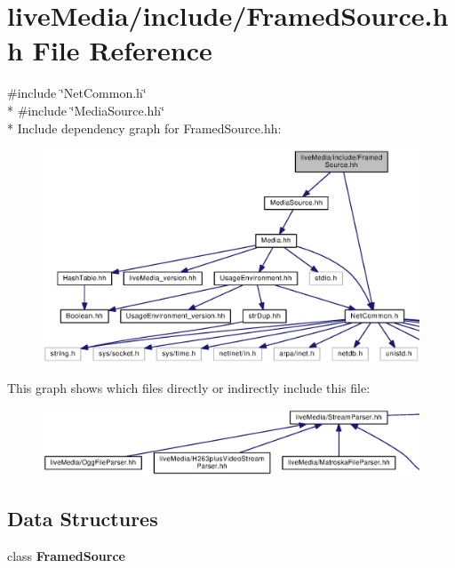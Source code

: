 \section{live\+Media/include/\+Framed\+Source.hh File Reference}
\label{FramedSource_8hh}
{\ttfamily \#include \char`\"{}Net\+Common.\+h\char`\"{}}\\*
{\ttfamily \#include \char`\"{}Media\+Source.\+hh\char`\"{}}\\*
Include dependency graph for Framed\+Source.\+hh\+:
\nopagebreak
\begin{figure}[H]
\begin{center}
\leavevmode
\includegraphics[width=350pt]{FramedSource_8hh__incl}
\end{center}
\end{figure}
This graph shows which files directly or indirectly include this file\+:
\nopagebreak
\begin{figure}[H]
\begin{center}
\leavevmode
\includegraphics[width=350pt]{FramedSource_8hh__dep__incl}
\end{center}
\end{figure}
\subsection*{Data Structures}
\begin{DoxyCompactItemize}
\item 
class {\bf Framed\+Source}
\end{DoxyCompactItemize}
